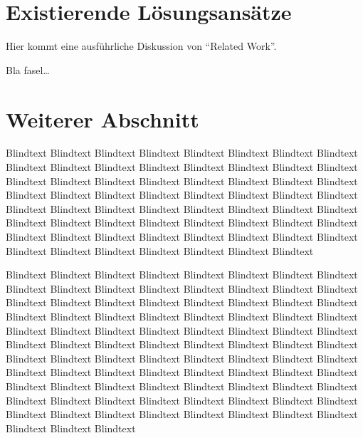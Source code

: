 \section{Existierende Lösungsansätze}
\label{ch:Analyse:sec:RelatedWork}

Hier kommt eine ausführliche Diskussion
von "`Related Work"'.

Bla fasel\ldots

\section{Weiterer Abschnitt}
\label{ch:Analyse:sec:Abschnitt}



Blindtext Blindtext Blindtext Blindtext Blindtext Blindtext Blindtext
Blindtext Blindtext Blindtext Blindtext Blindtext Blindtext Blindtext
Blindtext Blindtext Blindtext Blindtext Blindtext Blindtext Blindtext
Blindtext Blindtext Blindtext Blindtext Blindtext Blindtext Blindtext
Blindtext Blindtext Blindtext Blindtext Blindtext Blindtext Blindtext
Blindtext Blindtext Blindtext Blindtext Blindtext Blindtext Blindtext
Blindtext Blindtext Blindtext Blindtext Blindtext Blindtext Blindtext
Blindtext Blindtext Blindtext Blindtext Blindtext Blindtext Blindtext
Blindtext Blindtext Blindtext Blindtext Blindtext Blindtext Blindtext

Blindtext Blindtext Blindtext Blindtext Blindtext Blindtext Blindtext
Blindtext Blindtext Blindtext Blindtext Blindtext Blindtext Blindtext
Blindtext Blindtext Blindtext Blindtext Blindtext Blindtext Blindtext
Blindtext Blindtext Blindtext Blindtext Blindtext Blindtext Blindtext
Blindtext Blindtext Blindtext Blindtext Blindtext Blindtext Blindtext
Blindtext Blindtext Blindtext Blindtext Blindtext Blindtext Blindtext
Blindtext Blindtext Blindtext Blindtext Blindtext Blindtext Blindtext
Blindtext Blindtext Blindtext Blindtext Blindtext Blindtext Blindtext
Blindtext Blindtext Blindtext Blindtext Blindtext Blindtext Blindtext
Blindtext Blindtext Blindtext Blindtext Blindtext Blindtext Blindtext
Blindtext Blindtext Blindtext Blindtext Blindtext Blindtext Blindtext
Blindtext Blindtext Blindtext Blindtext Blindtext Blindtext Blindtext
Blindtext Blindtext Blindtext Blindtext Blindtext Blindtext Blindtext

